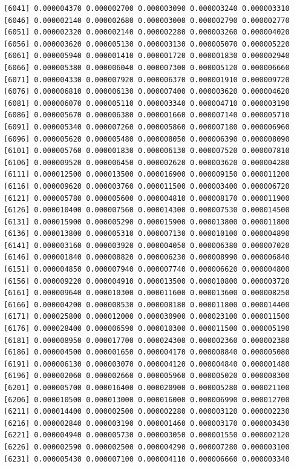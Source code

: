 \documentclass[]{article}
\begin{document}
\begin{verbatim}
 [6041] 0.000004370 0.000002700 0.000003090 0.000003240 0.000003310
 [6046] 0.000002140 0.000002680 0.000003000 0.000002790 0.000002770
 [6051] 0.000002320 0.000002140 0.000002280 0.000003260 0.000004020
 [6056] 0.000003620 0.000005130 0.000003130 0.000005070 0.000005220
 [6061] 0.000005940 0.000001410 0.000001720 0.000001830 0.000002940
 [6066] 0.000005380 0.000006040 0.000007300 0.000005120 0.000006660
 [6071] 0.000004330 0.000007920 0.000006370 0.000001910 0.000009720
 [6076] 0.000006810 0.000006130 0.000007400 0.000003620 0.000004620
 [6081] 0.000006070 0.000005110 0.000003340 0.000004710 0.000003190
 [6086] 0.000005670 0.000006380 0.000001660 0.000007140 0.000005710
 [6091] 0.000005340 0.000007260 0.000005860 0.000007180 0.000006960
 [6096] 0.000005620 0.000005480 0.000008050 0.000006390 0.000008090
 [6101] 0.000005760 0.000001830 0.000006130 0.000007520 0.000007810
 [6106] 0.000009520 0.000006450 0.000002620 0.000003620 0.000004280
 [6111] 0.000012500 0.000013500 0.000016900 0.000009150 0.000011200
 [6116] 0.000009620 0.000003760 0.000011500 0.000003400 0.000006720
 [6121] 0.000005780 0.000005600 0.000004810 0.000008170 0.000011900
 [6126] 0.000010400 0.000007560 0.000014300 0.000007530 0.000014500
 [6131] 0.000015900 0.000005290 0.000015900 0.000013800 0.000011800
 [6136] 0.000013800 0.000005310 0.000007130 0.000010100 0.000004890
 [6141] 0.000003160 0.000003920 0.000004050 0.000006380 0.000007020
 [6146] 0.000001840 0.000008820 0.000006230 0.000008990 0.000006840
 [6151] 0.000004850 0.000007940 0.000007740 0.000006620 0.000004800
 [6156] 0.000009220 0.000004910 0.000013500 0.000010800 0.000003720
 [6161] 0.000009640 0.000010300 0.000011600 0.000013600 0.000008250
 [6166] 0.000004200 0.000008530 0.000008180 0.000011800 0.000014400
 [6171] 0.000025800 0.000012000 0.000030900 0.000023100 0.000011500
 [6176] 0.000028400 0.000006590 0.000010300 0.000011500 0.000005190
 [6181] 0.000008950 0.000017700 0.000024300 0.000002360 0.000002380
 [6186] 0.000004500 0.000001650 0.000004170 0.000008840 0.000005080
 [6191] 0.000006130 0.000003070 0.000004120 0.000004840 0.000001480
 [6196] 0.000002060 0.000002660 0.000005960 0.000005020 0.000008300
 [6201] 0.000005700 0.000016400 0.000020900 0.000005280 0.000021100
 [6206] 0.000010500 0.000013000 0.000016000 0.000006990 0.000012700
 [6211] 0.000014400 0.000002500 0.000002280 0.000003120 0.000002230
 [6216] 0.000002840 0.000003190 0.000001460 0.000003170 0.000003430
 [6221] 0.000004940 0.000005730 0.000003050 0.000001550 0.000002120
 [6226] 0.000002590 0.000002500 0.000004290 0.000007280 0.000003100
 [6231] 0.000005430 0.000007100 0.000004110 0.000006660 0.000003340

\end{verbatim}
\end{document}
